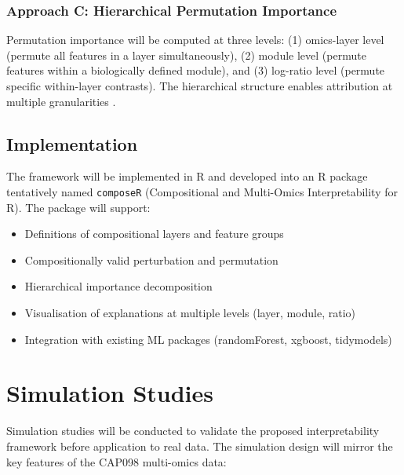 \documentclass[12pt,a4paper]{report}
\begin{document}
\subsubsection{Approach C: Hierarchical Permutation Importance}

Permutation importance will be computed at three levels: (1) omics-layer level (permute all features in a layer simultaneously), (2) module level (permute features within a biologically defined module), and (3) log-ratio level (permute specific within-layer contrasts). The hierarchical structure enables attribution at multiple granularities \cite{altmann2010}.

\subsection{Implementation}

The framework will be implemented in R and developed into an R package tentatively named \texttt{composeR} (Compositional and Multi-Omics Interpretability for R). The package will support:
\begin{itemize}
    \item Definitions of compositional layers and feature groups
    \item Compositionally valid perturbation and permutation
    \item Hierarchical importance decomposition
    \item Visualisation of explanations at multiple levels (layer, module, ratio)
    \item Integration with existing ML packages (randomForest, xgboost, tidymodels)
\end{itemize}

\section{Simulation Studies}

Simulation studies will be conducted to validate the proposed interpretability framework before application to real data. The simulation design will mirror the key features of the CAP098 multi-omics data:
\end{document}
